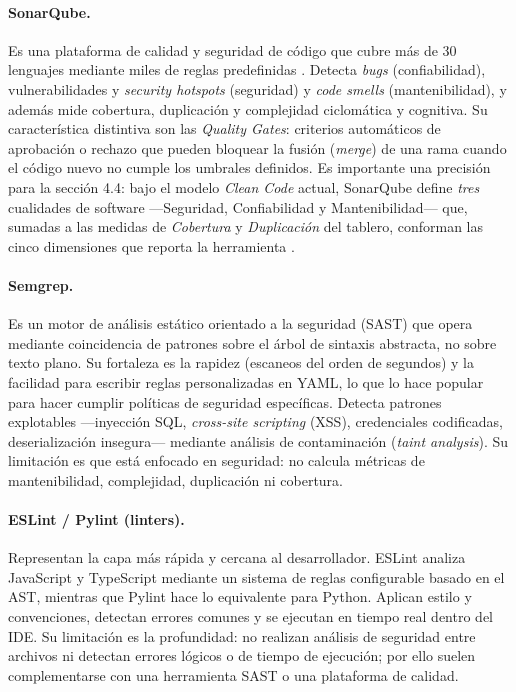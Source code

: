 \documentclass[12pt,a4paper]{article}
\begin{document}
\paragraph{SonarQube.}
Es una plataforma de calidad y seguridad de código que cubre más de 30 lenguajes mediante
miles de reglas predefinidas \citep{sonarqubedocs}. Detecta \textit{bugs}
(confiabilidad), vulnerabilidades y \textit{security hotspots} (seguridad) y \textit{code
smells} (mantenibilidad), y además mide cobertura, duplicación y complejidad ciclomática y
cognitiva. Su característica distintiva son las \textit{Quality Gates}: criterios
automáticos de aprobación o rechazo que pueden bloquear la fusión (\textit{merge}) de una
rama cuando el código nuevo no cumple los umbrales definidos. Es importante una precisión
para la sección 4.4: bajo el modelo \textit{Clean Code} actual, SonarQube define
\emph{tres} cualidades de software ---Seguridad, Confiabilidad y Mantenibilidad--- que,
sumadas a las medidas de \emph{Cobertura} y \emph{Duplicación} del tablero, conforman las
cinco dimensiones que reporta la herramienta \citep{sonarqubedocs}.

\paragraph{Semgrep.}
Es un motor de análisis estático orientado a la seguridad (SAST) que opera mediante
coincidencia de patrones sobre el árbol de sintaxis abstracta, no sobre texto plano. Su
fortaleza es la rapidez (escaneos del orden de segundos) y la facilidad para escribir
reglas personalizadas en YAML, lo que lo hace popular para hacer cumplir políticas de
seguridad específicas. Detecta patrones explotables ---inyección SQL, \textit{cross-site
scripting} (XSS), credenciales codificadas, deserialización insegura--- mediante análisis
de contaminación (\textit{taint analysis}). Su limitación es que está enfocado en
seguridad: no calcula métricas de mantenibilidad, complejidad, duplicación ni cobertura.

\paragraph{ESLint / Pylint (linters).}
Representan la capa más rápida y cercana al desarrollador. ESLint analiza JavaScript y
TypeScript mediante un sistema de reglas configurable basado en el AST, mientras que Pylint
hace lo equivalente para Python. Aplican estilo y convenciones, detectan errores comunes y
se ejecutan en tiempo real dentro del IDE. Su limitación es la profundidad: no realizan
análisis de seguridad entre archivos ni detectan errores lógicos o de tiempo de ejecución;
por ello suelen complementarse con una herramienta SAST o una plataforma de calidad.
\end{document}
